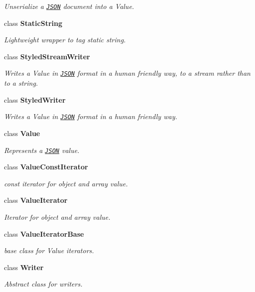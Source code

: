 \begin{DoxyCompactItemize}
\begin{DoxyCompactList}\small\item\em Unserialize a \href{http://www.json.org}{\tt J\+S\+O\+N} document into a Value. \end{DoxyCompactList}\item 
class {\bfseries Static\+String}
\begin{DoxyCompactList}\small\item\em Lightweight wrapper to tag static string. \end{DoxyCompactList}\item 
class {\bfseries Styled\+Stream\+Writer}
\begin{DoxyCompactList}\small\item\em Writes a Value in \href{http://www.json.org}{\tt J\+S\+O\+N} format in a human friendly way, to a stream rather than to a string. \end{DoxyCompactList}\item 
class {\bfseries Styled\+Writer}
\begin{DoxyCompactList}\small\item\em Writes a Value in \href{http://www.json.org}{\tt J\+S\+O\+N} format in a human friendly way. \end{DoxyCompactList}\item 
class {\bfseries Value}
\begin{DoxyCompactList}\small\item\em Represents a \href{http://www.json.org}{\tt J\+S\+O\+N} value. \end{DoxyCompactList}\item 
class {\bfseries Value\+Const\+Iterator}
\begin{DoxyCompactList}\small\item\em const iterator for object and array value. \end{DoxyCompactList}\item 
class {\bfseries Value\+Iterator}
\begin{DoxyCompactList}\small\item\em Iterator for object and array value. \end{DoxyCompactList}\item 
class {\bfseries Value\+Iterator\+Base}
\begin{DoxyCompactList}\small\item\em base class for Value iterators. \end{DoxyCompactList}\item 
class {\bfseries Writer}
\begin{DoxyCompactList}\small\item\em Abstract class for writers. \end{DoxyCompactList}\end{DoxyCompactItemize}

